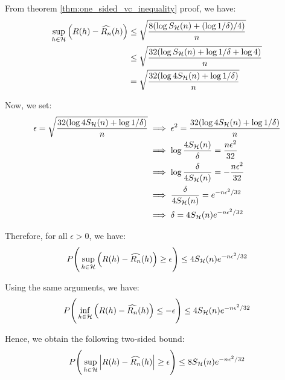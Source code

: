 \begin{proof*}
    From theorem \ref{thm:one_sided_vc_inequality} proof, we have:
    \begin{align*}
        \sup_{h\in\mathcal{H}} \Big(  R(h) - \widehat{R_n}(h)  \Big)
        &\le \sqrt{
            \frac{8(\log S_{\mathcal{H}}(n) + (\log 1/\delta)/4)}{n}
        } \\
        &\le \sqrt{
            \frac{32(\log S_{\mathcal{H}}(n) + \log 1/\delta + \log 4)}{n}
        } \\
        &= \sqrt{
            \frac{32(\log4S_{\mathcal{H}}(n) + \log1/\delta)}{n}
        }
    \end{align*}

    \noindent Now, we set:
    \begin{align*}
        \epsilon = \sqrt{
            \frac{32(\log4S_{\mathcal{H}}(n) + \log1/\delta)}{n}
        } 
        &\implies \epsilon^2 = \frac{32(\log4S_{\mathcal{H}}(n) + \log1/\delta)}{n} \\
        &\implies \log\frac{4S_{\mathcal{H}}(n)}{\delta} = \frac{n\epsilon^2}{32} \\
        &\implies \log\frac{\delta}{4S_{\mathcal{H}}(n)} = -\frac{n\epsilon^2}{32} \\
        &\implies \frac{\delta}{4S_{\mathcal{H}}(n)} = e^{-n\epsilon^2/32} \\
        &\implies \delta = 4S_{\mathcal{H}}(n)e^{-n\epsilon^2/32}
    \end{align*}

    \noindent Therefore, for all $\epsilon > 0$, we have:
    \begin{align*}
        P\Bigg( 
            \sup_{h\in\mathcal{H}} \Big( 
                R(h) - \widehat{R_n}(h)
             \Big) \ge \epsilon
         \Bigg) \le 4S_{\mathcal{H}}(n)e^{-n\epsilon^2/32}
    \end{align*}

    \noindent Using the same arguments, we have:
    \begin{align*}
        P\Bigg( 
            \inf_{h\in\mathcal{H}} \Big( 
                R(h) - \widehat{R_n}(h)
             \Big) \le -\epsilon
         \Bigg) \le 4S_{\mathcal{H}}(n)e^{-n\epsilon^2/32}
    \end{align*}

    \noindent Hence, we obtain the following two-sided bound:
    \begin{align*}
        P\Bigg( 
            \sup_{h\in\mathcal{H}}\Big| 
                R(h) - \widehat{R_n}(h)
             \Big| \ge \epsilon
         \Bigg) \le 8S_{\mathcal{H}}(n)e^{-n\epsilon^2/32}
    \end{align*}
\end{proof*}

